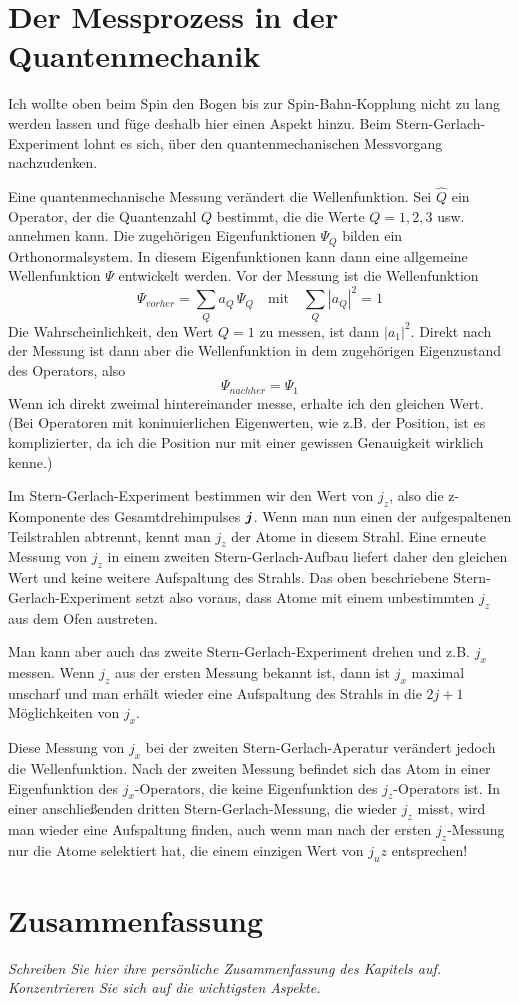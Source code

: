 \section{Der Messprozess in der Quantenmechanik}

Ich wollte oben beim Spin den Bogen bis zur Spin-Bahn-Kopplung nicht zu lang werden lassen und füge deshalb hier einen Aspekt hinzu. Beim Stern-Gerlach-Experiment lohnt es sich, über den quantenmechanischen Messvorgang nachzudenken. 

Eine quantenmechanische Messung verändert die Wellenfunktion. Sei $\hat{Q}$ ein Operator, der die Quantenzahl $Q$ bestimmt, die die Werte $Q=1,2,3$ usw. annehmen kann. Die zugehörigen Eigenfunktionen $\Psi_Q$ bilden ein Orthonormalsystem. In diesem Eigenfunktionen kann dann eine allgemeine Wellenfunktion $\Psi$ entwickelt werden. Vor der Messung ist die Wellenfunktion
\begin{equation}
    \Psi_{vorher} = \sum_Q a_Q  \, \Psi_Q \quad \text{mit} \quad \sum_Q |a_Q|^2 = 1
\end{equation}
Die Wahrscheinlichkeit, den Wert $Q=1$ zu messen, ist dann $|a_1|^2$. Direkt nach der Messung ist dann aber die Wellenfunktion in dem zugehörigen Eigenzustand des Operators, also 
\begin{equation}
    \Psi_{nachher} = \Psi_1
\end{equation}
Wenn ich direkt zweimal hintereinander messe, erhalte ich den gleichen Wert. (Bei Operatoren mit koninuierlichen Eigenwerten, wie z.B. der Position, ist es komplizierter, da ich die Position nur mit einer gewissen Genauigkeit wirklich kenne.)


Im Stern-Gerlach-Experiment bestimmen wir den Wert von $j_z$, also die z-Komponente des Gesamtdrehimpulses $\boldsymbol{j}$. Wenn man nun einen der aufgespaltenen Teilstrahlen abtrennt, kennt man $j_z$ der Atome in diesem Strahl. Eine erneute Messung von $j_z$ in einem zweiten Stern-Gerlach-Aufbau liefert daher den gleichen Wert und keine weitere Aufspaltung des Strahls. Das oben beschriebene Stern-Gerlach-Experiment setzt also voraus, dass Atome mit einem unbestimmten $j_z$ aus dem Ofen austreten.


Man kann aber auch das zweite Stern-Gerlach-Experiment drehen und z.B. $j_x$ messen. Wenn $j_z$ aus der ersten Messung bekannt ist, dann ist $j_x$ maximal unscharf und man erhält wieder eine Aufspaltung des Strahls in die $2j+1$ Möglichkeiten von $j_x$.

Diese Messung von $j_x$ bei der zweiten Stern-Gerlach-Aperatur verändert jedoch die Wellenfunktion. Nach der zweiten Messung befindet sich das Atom in einer Eigenfunktion des $j_x$-Operators, die keine Eigenfunktion des $j_z$-Operators ist. In einer anschließenden dritten Stern-Gerlach-Messung, die wieder $j_z$ misst, wird man wieder eine Aufspaltung finden, auch wenn man nach der ersten $j_z$-Messung nur die Atome selektiert hat, die einem einzigen Wert von $j_uz$ entsprechen!


\section{Zusammenfassung}

\textit{Schreiben Sie hier ihre persönliche Zusammenfassung des Kapitels auf. Konzentrieren Sie sich auf die wichtigsten Aspekte.}

\vspace*{10cm}



\printbibliography[segment=\therefsegment,heading=subbibliography]
